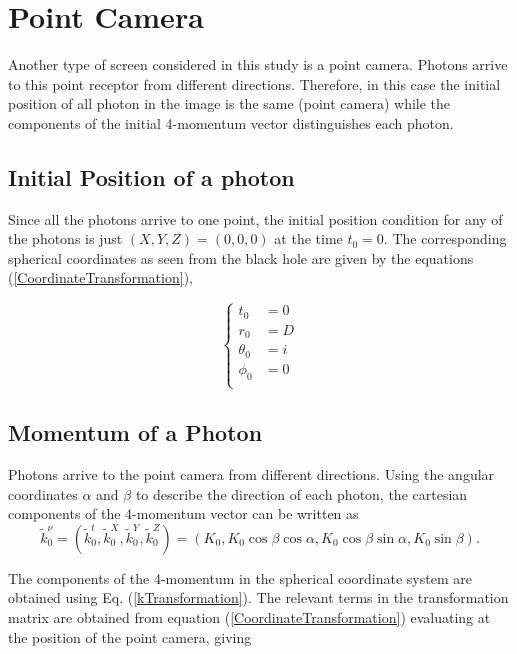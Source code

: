 \section{Point Camera}

Another type of screen considered in this study is a point camera. Photons arrive to this point receptor  from different directions. Therefore, in this case the initial position of all photon in the image is the same (point camera) while the components of the initial 4-momentum vector distinguishes each photon.

\subsection{Initial Position of a photon}

Since all the photons arrive to one point, the initial position condition for any of the photons is just $(X,Y,Z) = (0,0,0)$ at the time $t_0 = 0$. The corresponding spherical coordinates as seen from the black hole are given by the equations (\ref{CoordinateTransformation}),

\begin{equation}
\begin{cases}
t_0 &= 0\\
r_0 &= D\\
\theta_0 &= i \\
\phi_0 &= 0 \\
\end{cases} 
\end{equation}

\subsection{Momentum of a Photon}

Photons arrive to the point camera from different directions. Using the angular coordinates $\alpha$ and $\beta$ to describe the direction of each photon, the cartesian components of the 4-momentum vector can be written as
\begin{equation}
\tilde{k}^\nu_0 =\left( \tilde{k}^t_0, \tilde{k}^X_0, \tilde{k}^Y_0, \tilde{k}^Z_0 \right) = \left( K_0, K_0 \cos \beta \cos \alpha , K_0 \cos \beta \sin \alpha , K_0 \sin \beta \right).
\end{equation}

The components of the 4-momentum in the spherical coordinate system  are obtained using  Eq. (\ref{kTransformation}). The relevant terms in the transformation matrix are obtained from equation (\ref{CoordinateTransformation}) evaluating at the position of the point camera, giving

